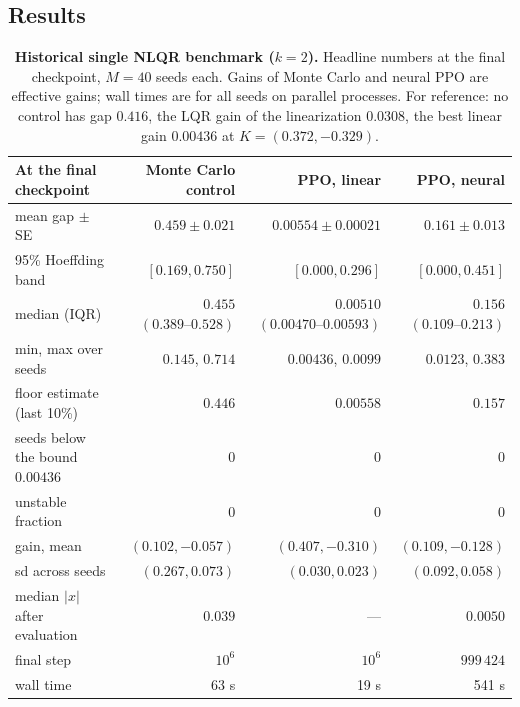 \documentclass[11pt]{article}
\begin{document}
\subsection{Results}
\label{sec:results}

\begin{table}[H]
  \centering
  \small
  \begin{tabular}{@{}lrrr@{}}
    \toprule
    At the final checkpoint & Monte Carlo control & PPO, linear & PPO, neural \\
    \midrule
    mean gap $\pm$ SE & $0.459 \pm 0.021$ & $0.00554 \pm 0.00021$ & $0.161 \pm 0.013$ \\
    95\% Hoeffding band & $[0.169, 0.750]$ & $[0.000, 0.296]$ & $[0.000, 0.451]$ \\
    median (IQR) & $0.455$ $(0.389\text{--}0.528)$ & $0.00510$ $(0.00470\text{--}0.00593)$ & $0.156$ $(0.109\text{--}0.213)$ \\
    min, max over seeds & $0.145$, $0.714$ & $0.00436$, $0.0099$ & $0.0123$, $0.383$ \\
    floor estimate (last 10\%) & $0.446$ & $0.00558$ & $0.157$ \\
    seeds below the bound $0.00436$ & 0 & 0 & 0 \\
    unstable fraction & $0$ & $0$ & $0$ \\
    gain, mean & $(0.102, -0.057)$ & $(0.407, -0.310)$ & $(0.109, -0.128)$ \\
    \quad sd across seeds & $(0.267, 0.073)$ & $(0.030, 0.023)$ & $(0.092, 0.058)$ \\
    median $|x|$ after evaluation & $0.039$ & --- & $0.0050$ \\
    final step & $10^6$ & $10^6$ & $999\,424$ \\
    wall time & 63 s & 19 s & 541 s \\
    \bottomrule
  \end{tabular}
  \caption{\textbf{Historical single NLQR benchmark ($k=2$).} Headline numbers at the final checkpoint, $M = 40$ seeds each. Gains of Monte Carlo and
    neural PPO are effective gains; wall times are for all seeds on parallel processes. For reference: no control
    has gap $0.416$, the LQR gain of the linearization $0.0308$, the best linear gain $0.00436$ at
    $K = (0.372, -0.329)$.}
  \label{tab:results}
\end{table}
\end{document}
